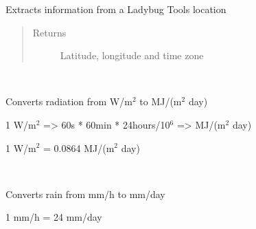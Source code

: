 \documentclass[letterpaper,10pt,english]{sphinxmanual}
\begin{document}
\begin{fulllineitems}

\begin{fulllineitems}
\label{\detokenize{cmf:livestock.components.comp_cmf.CMFWeather.convert_location}}
Extracts information from a Ladybug Tools location
\begin{quote}\begin{description}
\item[{Returns}] \leavevmode
Latitude, longitude and time zone

\end{description}\end{quote}

\end{fulllineitems}


\begin{fulllineitems}
\label{\detokenize{cmf:livestock.components.comp_cmf.CMFWeather.convert_radiation_unit}}~
\begin{DUlineblock}{0em}
\item[] Converts radiation from W/m$^{\text{2}}$ to MJ/(m$^{\text{2}}$ day)
\item[] 1 W/m$^{\text{2}}$ =\textgreater{} 60s * 60min * 24hours/10$^{\text{6}}$ =\textgreater{} MJ/(m$^{\text{2}}$ day)
\item[] 1 W/m$^{\text{2}}$ = 0.0864 MJ/(m$^{\text{2}}$ day)
\end{DUlineblock}

\end{fulllineitems}


\begin{fulllineitems}
\label{\detokenize{cmf:livestock.components.comp_cmf.CMFWeather.convert_rain_unit}}~
\begin{DUlineblock}{0em}
\item[] Converts rain from mm/h to mm/day
\item[] 1 mm/h = 24 mm/day
\end{DUlineblock}

\end{fulllineitems}


\end{fulllineitems}
\end{document}
